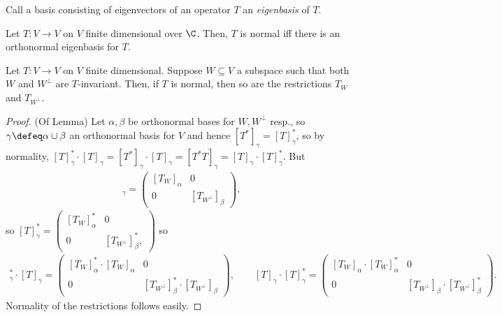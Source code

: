 \begin{definition}[Eigenbasis]
    Call a basis consisting of eigenvectors of an operator $T$ an \emph{eigenbasis} of $T$.
\end{definition}

\begin{theorem}\label{thm:diagnormal}
    Let $T : V\to V$ on $V$ finite dimensional over $\C$. Then, $T$ is normal iff there is an orthonormal eigenbasis for $T$.
\end{theorem}

\begin{lemma}
    Let $T : V \to V$ on $V$ finite dimensional. Suppose $W \subseteq V$ a subspace such that both $W$ and $W^\perp$ are $T$-invariant. Then, if $T$ is normal, then so are the restrictions $T_W$ and $T_{W^\perp}$.
\end{lemma}

\begin{proof}(Of Lemma)
    Let $\alpha, \beta$ be orthonormal bases for $W, W^\perp$ resp., so $\gamma \defeq \alpha \cup \beta$ an orthonormal basis for $V$ and hence $[T^\ast]_\gamma = [T]^\ast_\gamma$, so by normality, $[T]_\gamma^\ast \cdot [T]_\gamma = [T^\ast]_\gamma\cdot [T]_\gamma = [T^\ast T]_\gamma = [T]_\gamma \cdot [T]_\gamma^\ast$. But \begin{align*}
        [T]_\gamma = \begin{pmatrix}
            [T_W]_\alpha & 0\\
            0 & [T_{W^\perp}]_\beta
        \end{pmatrix},
    \end{align*}
    so $[T]_\gamma^\ast = \begin{pmatrix}
        [T_W]_\alpha^\ast & 0\\
        0 & [T_{W^\perp}]_\beta^\ast,
    \end{pmatrix}$
    so \begin{align*}
        [T]_\gamma^\ast \cdot [T]_\gamma = \begin{pmatrix}
            [T_W]_\alpha^\ast \cdot [T_W]_\alpha & 0\\
            0 & [T_{W^\perp}]_\beta^\ast \cdot [T_{W^\perp}]_\beta
        \end{pmatrix}, \qquad [T]_\gamma \cdot [T]_\gamma^\ast = \begin{pmatrix}
            [T_W]_\alpha \cdot [T_W]_\alpha^\ast & 0\\
            0 & [T_{W^\perp}]_\beta \cdot [T_{W^\perp}]_\beta^\ast
        \end{pmatrix}.
    \end{align*}
    Normality of the restrictions follows easily.
\end{proof}

